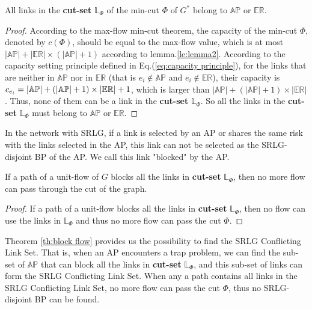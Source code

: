 \begin{lemma}
\label{le:lemma3}
    All  links in the \textbf{cut-set} $\mathbb{L}_{\Phi}$ of the min-cut $\Phi$ of $G^*$ belong to $\mathbb{AP}$ or $\mathbb{\mathbb{ER}}$.
\end{lemma}
\begin{proof}
    According to the max-flow min-cut theorem, the capacity of the min-cut $\Phi$, denoted by $c(\Phi)$, should be equal to the max-flow value, which is at most $|\mathbb{AP}|+ |\mathbb{ER}|\times (|\mathbb{AP}|+1)$ according to lemma.\ref{le:lemma2}. According to the capacity setting principle defined in Eq.(\ref{eq:capacity principle}), for the links that are neither in $\mathbb{AP}$ nor in $\mathbb{ER}$ (that is $e_i \notin \mathbb{AP}$ and $e_i \notin \mathbb{ER}$), their capacity is $c_{e_i} = \left| {{\rm\mathbb{AP}}} \right| + \left( {\left| {{\rm\mathbb{AP}}} \right| + 1} \right)\times \left| {{\rm{\mathbb{E}}}{{\rm{\mathbb{R}}}}} \right| + 1$, which is larger than $|\mathbb{AP}|+(|\mathbb{AP}|+1)\times |\mathbb{ER}|$. Thus, none of them can be a link in the \textbf{cut-set} $\mathbb{L}_{\Phi}$. So all the  links in the \textbf{cut-set} $\mathbb{L}_{\Phi}$ must belong to $\mathbb{AP}$ or $\mathbb{ER}$.
\end{proof}
In the network with SRLG, if  a link is selected by an AP or shares the same risk with the links selected in the AP, this link can not be selected as the SRLG-disjoint BP of the AP. We call this link "blocked" by the AP.

\begin{theorem}
    If a path of a unit-flow of $G$ blocks all the links in \textbf{cut-set} $\mathbb{L}_{\Phi}$, then no more flow can pass through the cut of the graph.
\label{th:block flow}
\end{theorem}

\begin{proof}
    If a path of a unit-flow blocks all the links in \textbf{cut-set} $\mathbb{L}_{\Phi}$, then no flow can use the links in  $\mathbb{L}_{\Phi}$ and thus no more flow can pass the cut $\Phi$.
\end{proof}

Theorem \ref{th:block flow} provides us the possibility to find the SRLG Conflicting Link Set. That is, when an AP encounters a trap problem, we can find the sub-set of  $\mathbb{AP}$  that can block all the links in  \textbf{cut-set} $\mathbb{L}_{\Phi}$, and this sub-set of links can form the  SRLG Conflicting Link Set. When any a path contains all links in the SRLG Conflicting Link Set, no more flow can pass the cut $\Phi$, thus no SRLG-disjoint BP can be found.


